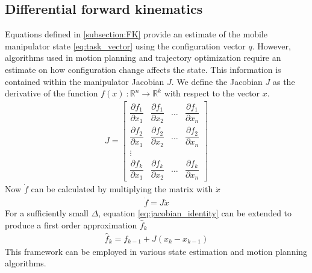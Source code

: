 \documentclass[times, utf8, diplomski, english]{fer}
\begin{document}
\subsection{Differential forward kinematics}
Equations defined in \ref{subsection:FK} provide an estimate of the mobile manipulator state \eqref{eq:task_vector} using the configuration vector $q$. 
However, algorithms used in motion planning and trajectory optimization require an estimate on how configuration change affects the state.
This information is contained within the manipulator Jacobian $J$.
We define the Jacobian $J$ as the derivative of the function $f\left(x\right) \ : \mathbb{R}^n \rightarrow \mathbb{R}^k $ with respect to the vector $x$.
\begin{align}\label{eq:jacobian}
J =
\begin{bmatrix}
    \dfrac{\partial {f_1}}{\partial x_{1}}      & \dfrac{\partial {f}_{1}}{\partial x_{2}}  & \dots & \dfrac{\partial {f}_{1}}{\partial x_{n}}  \\
    \dfrac{\partial{f_2}}{\partial x_{1}}      & \dfrac{\partial {f}_{2}}{\partial x_{2}}  & \dots & \dfrac{\partial {f}_{2}}{\partial x_{n}} \\
    \vdots \\
    \dfrac{\partial {f_k}}{\partial x_{1}}      & \dfrac{\partial {f}_{k}}{\partial x_{2}}  & \dots & \dfrac{\partial {f}_{k}}{\partial x_{n}}
\end{bmatrix}
\end{align}
Now $\dot{f}$ can be calculated by multiplying the matrix with $\dot{x}$
\begin{align} \label{eq:jacobian_identity}
\dot{f} = J \dot{x}
\end{align}
For a sufficiently small $\Delta$, equation \ref{eq:jacobian_identity} can be extended to produce a first order approximation $\hat{f}_k$ 
\begin{align} \label{eq:jacobian_estimate}
\hat{f}_k = f_{k-1} + J\left(x_{k} - x_{k-1}\right)
\end{align}
This framework can be employed in various state estimation and motion planning algorithms.
\end{document}
